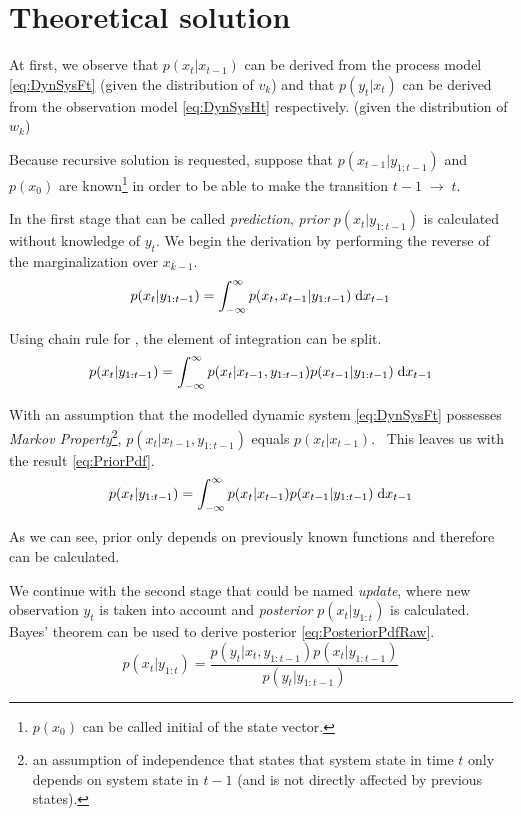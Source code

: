 \section{Theoretical solution}

At first, we observe that {\pdf} \(p(x_t|x_{t-1})\) can be derived from the process model
\eqref{eq:DynSysFt} (given the distribution of \(v_k\)) and that \(p(y_t|x_t)\) can be derived from
the observation model \eqref{eq:DynSysHt} respectively. (given the distribution of \(w_k\))

Because recursive solution is requested, suppose that \(p(x_{t-1}|y_{1:t-1})\) and
\(p(x_0)\) are known\footnote{\(p(x_0)\) can be called initial {\pdf} of the state vector.} in
order to be able to make the transition \(t-1 \; \rightarrow \; t\).

In the first stage that can be called \emph{prediction}, \emph{prior} {\pdf}
\(p(x_t | y_{1:t-1})\) is calculated without knowledge of \(y_t\). We begin the derivation by
performing the reverse of the marginalization over \(x_{k-1}\).
\begin{equation*}
	p(x_t | y_{1:t-1}) = \int_{-\infty}^{\infty} p(x_t, x_{t-1} | y_{1:t-1}) \; \mathrm{d}x_{t-1}
\end{equation*}

Using chain rule for {\pdfs}, the element of integration can be split.
\begin{equation*}
	p(x_t | y_{1:t-1}) = \int_{-\infty}^{\infty} p(x_t | x_{t-1}, y_{1:t-1}) p(x_{t-1} | y_{1:t-1}) \; \mathrm{d}x_{t-1}
\end{equation*}

With an assumption that the modelled dynamic system \eqref{eq:DynSysFt} possesses \emph{Markov
Property}\footnote{an assumption of independence that states that system state in time \(t\) only
depends on system state in \(t-1\) (and is not directly affected by previous states).},
\(p(x_t | x_{t-1}, y_{1:t-1})\) equals \(p(x_t | x_{t-1})\).~\cite{AruMasGor:02}
This leaves us with the result \eqref{eq:PriorPdf}.
\begin{equation} \label{eq:PriorPdf}
	p(x_t | y_{1:t-1}) = \int_{-\infty}^{\infty} p(x_t | x_{t-1}) p(x_{t-1} | y_{1:t-1}) \; \mathrm{d}x_{t-1}
\end{equation}

As we can see, prior {\pdf} only depends on previously known functions and therefore can be
calculated.

We continue with the second stage that could be named \emph{update}, where new observation \(y_t\) is taken into
account and \emph{posterior} {\pdf} \(p(x_t | y_{1:t})\) is calculated. Bayes' theorem can be used
to derive posterior {\pdf} \eqref{eq:PosteriorPdfRaw}.
\begin{equation} \label{eq:PosteriorPdfRaw}
	p(x_t | y_{1:t}) = \frac{p(y_t | x_t, y_{1:t-1}) p(x_t | y_{1:t-1})}{p(y_t | y_{1:t-1})}
\end{equation}

